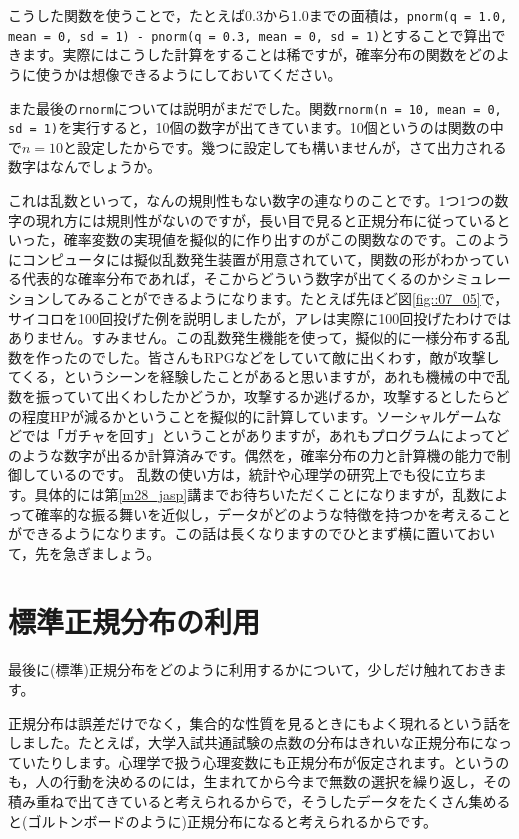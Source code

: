 \documentclass{ltjbook}
\begin{document}
こうした関数を使うことで，たとえば0.3から1.0までの面積は，\texttt{pnorm(q = 1.0, mean = 0, sd = 1) - pnorm(q = 0.3, mean = 0, sd = 1)}とすることで算出できます。実際にはこうした計算をすることは稀ですが，確率分布の関数をどのように使うかは想像できるようにしておいてください。

また最後の\texttt{rnorm}については説明がまだでした。関数\texttt{rnorm(n = 10, mean = 0, sd = 1)}を実行すると，10個の数字が出てきています。10個というのは関数の中で$n=10$と設定したからです。幾つに設定しても構いませんが，さて出力される数字はなんでしょうか。

これは乱数といって，なんの規則性もない数字の連なりのことです。1つ1つの数字の現れ方には規則性がないのですが，長い目で見ると正規分布に従っているといった，確率変数の実現値を擬似的に作り出すのがこの関数なのです。このようにコンピュータには擬似乱数発生装置が用意されていて，関数の形がわかっている代表的な確率分布であれば，そこからどういう数字が出てくるのかシミュレーションしてみることができるようになります。たとえば先ほど図\ref{fig::07_05}で，サイコロを100回投げた例を説明しましたが，アレは実際に100回投げたわけではありません。すみません。この乱数発生機能を使って，擬似的に一様分布する乱数を作ったのでした。皆さんもRPGなどをしていて敵に出くわす，敵が攻撃してくる，というシーンを経験したことがあると思いますが，あれも機械の中で乱数を振っていて出くわしたかどうか，攻撃するか逃げるか，攻撃するとしたらどの程度HPが減るかということを擬似的に計算しています。ソーシャルゲームなどでは「ガチャを回す」ということがありますが，あれもプログラムによってどのような数字が出るか計算済みです。偶然を，確率分布の力と計算機の能力で制御しているのです。
\label{randomVariablesMethod}
乱数の使い方は，統計や心理学の研究上でも役に立ちます。具体的には第\ref{m28_jasp}講までお待ちいただくことになりますが，乱数によって確率的な振る舞いを近似し，データがどのような特徴を持つかを考えることができるようになります。この話は長くなりますのでひとまず横に置いておいて，先を急ぎましょう。

\section{標準正規分布の利用}
\label{UsefulNormal}
最後に(標準)正規分布をどのように利用するかについて，少しだけ触れておきます。

正規分布は誤差だけでなく，集合的な性質を見るときにもよく現れるという話をしました。たとえば，大学入試共通試験の点数の分布はきれいな正規分布になっていたりします。心理学で扱う心理変数にも正規分布が仮定されます。というのも，人の行動を決めるのには，生まれてから今まで無数の選択を繰り返し，その積み重ねで出てきていると考えられるからで，そうしたデータをたくさん集めると(ゴルトンボードのように)正規分布になると考えられるからです。
\end{document}

